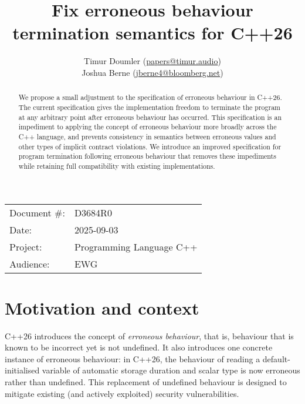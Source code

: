 

 \usepackage[bottom]{footmisc} 



\title{Fix erroneous behaviour termination semantics for C++26}
\author{
  Timur Doumler \small(\href{mailto:papers@timur.audio}{papers@timur.audio}) \\
  Joshua Berne \small(\href{mailto:jberne4@bloomberg.net}{jberne4@bloomberg.net}) 
}
\date{}
\maketitle

\begin{tabular}{ll}
Document \#: & D3684R0 \\
Date: &2025-09-03 \\
Project: & Programming Language C++ \\
Audience: & EWG
\end{tabular}

\begin{abstract}
We propose a small adjustment to the specification of erroneous behaviour in C++26. The current specification gives the implementation  freedom to terminate the program at any arbitrary point after erroneous behaviour has occurred. This specification is an impediment to applying the concept of erroneous behaviour more broadly across the C++ language, and prevents consistency in semantics between erroneous values and other types of implicit contract violations. We introduce an improved specification for program termination following erroneous behaviour that removes these impediments while retaining full compatibility with existing implementations.
\end{abstract}


\section{Motivation and context}

C++26 introduces the concept of \emph{erroneous behaviour}, that is, behaviour that is known to be incorrect yet is not undefined. It also introduces one concrete instance of erroneous behaviour: in C++26, the behaviour of reading a default-initialised variable of automatic storage duration and scalar type is now erroneous rather than undefined. This replacement of undefined behaviour is designed to mitigate existing (and actively exploited) security vulnerabilities.

